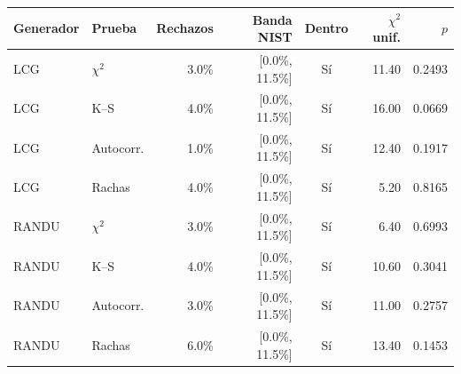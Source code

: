 \begin{tabular}{llrrcrr}
\toprule
Generador & Prueba & Rechazos & Banda NIST & Dentro & $\chi^2$ unif. & $p$ \\
\midrule
LCG & $\chi^2$ & 3.0\% & [0.0\%, 11.5\%] & Sí & 11.40 & 0.2493 \\
LCG & K--S & 4.0\% & [0.0\%, 11.5\%] & Sí & 16.00 & 0.0669 \\
LCG & Autocorr. & 1.0\% & [0.0\%, 11.5\%] & Sí & 12.40 & 0.1917 \\
LCG & Rachas & 4.0\% & [0.0\%, 11.5\%] & Sí & 5.20 & 0.8165 \\
RANDU & $\chi^2$ & 3.0\% & [0.0\%, 11.5\%] & Sí & 6.40 & 0.6993 \\
RANDU & K--S & 4.0\% & [0.0\%, 11.5\%] & Sí & 10.60 & 0.3041 \\
RANDU & Autocorr. & 3.0\% & [0.0\%, 11.5\%] & Sí & 11.00 & 0.2757 \\
RANDU & Rachas & 6.0\% & [0.0\%, 11.5\%] & Sí & 13.40 & 0.1453 \\
\bottomrule
\end{tabular}
